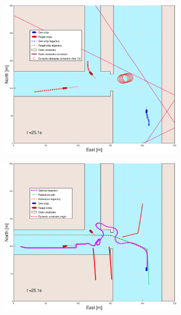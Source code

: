 \begin{figure}[!b]
\begin{subfigure}[b]{0.499\textwidth}
    \end{subfigure}
    \hfill
    \\
    \begin{subfigure}[b]{0.49\textwidth}
        \centering
        \includegraphics[width=\textwidth]{Images/Figures/Havn1/_Simple_0fig1_time=25}
    \end{subfigure}
    \hfill
    \begin{subfigure}[b]{0.499\textwidth}
        \centering
        \includegraphics[width=\textwidth]{Images/Figures/Havn1/_Simple_0fig999_time=25}
    \end{subfigure}
    \hfill
\end{figure}%
